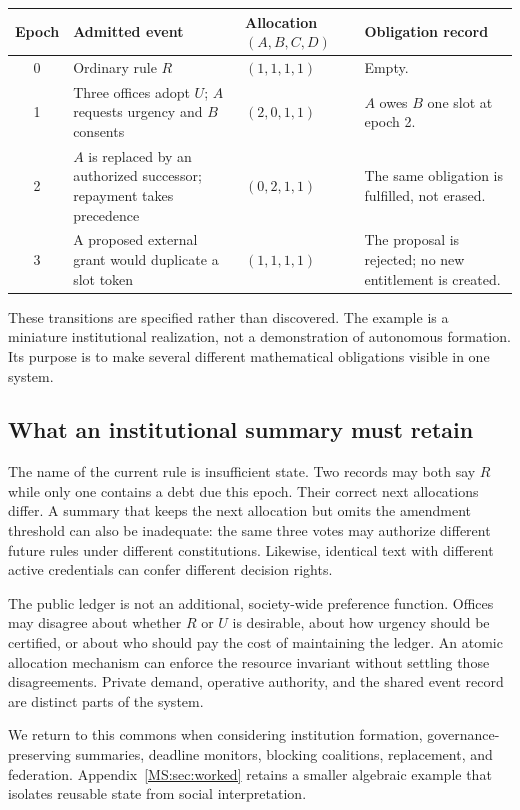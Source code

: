 \begin{center}
\begin{tabularx}{\linewidth}{@{}cP{.25\linewidth}P{.19\linewidth}X@{}}
\toprule
Epoch & Admitted event & Allocation $(A,B,C,D)$ & Obligation record\\
 & Ordinary rule $R$ & $(1,1,1,1)$ & Empty.\\[.35em]
1 & Three offices adopt $U$; $A$ requests urgency and $B$ consents & $(2,0,1,1)$ & $A$ owes $B$ one slot at epoch 2.\\[.35em]
2 & $A$ is replaced by an authorized successor; repayment takes precedence & $(0,2,1,1)$ & The same obligation is fulfilled, not erased.\\[.35em]
3 & A proposed external grant would duplicate a slot token & $(1,1,1,1)$ & The proposal is rejected; no new entitlement is created.\\
\bottomrule
\end{tabularx}
\end{center}

These transitions are specified rather than discovered. The example is a miniature institutional realization, not a demonstration of autonomous formation. Its purpose is to make several different mathematical obligations visible in one system.

\subsection{What an institutional summary must retain}
The name of the current rule is insufficient state. Two records may both say $R$ while only one contains a debt due this epoch. Their correct next allocations differ. A summary that keeps the next allocation but omits the amendment threshold can also be inadequate: the same three votes may authorize different future rules under different constitutions. Likewise, identical text with different active credentials can confer different decision rights.

The public ledger is not an additional, society-wide preference function. Offices may disagree about whether $R$ or $U$ is desirable, about how urgency should be certified, or about who should pay the cost of maintaining the ledger. An atomic allocation mechanism can enforce the resource invariant without settling those disagreements. Private demand, operative authority, and the shared event record are distinct parts of the system.

We return to this commons when considering institution formation, governance-preserving summaries, deadline monitors, blocking coalitions, replacement, and federation. Appendix~\ref{MS:sec:worked} retains a smaller algebraic example that isolates reusable state from social interpretation.

